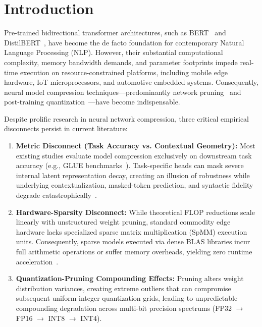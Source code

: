\documentclass[conference]{IEEEtran}
\begin{document}
\section{Introduction}
Pre-trained bidirectional transformer architectures, such as BERT~\cite{devlin2018bert} and DistilBERT~\cite{sanh2019distilbert}, have become the de facto foundation for contemporary Natural Language Processing (NLP). However, their substantial computational complexity, memory bandwidth demands, and parameter footprints impede real-time execution on resource-constrained platforms, including mobile edge hardware, IoT microprocessors, and automotive embedded systems. Consequently, neural model compression techniques---predominantly network pruning~\cite{han2015learning,han2016deep,frankle2018lottery} and post-training quantization~\cite{jacob2018quantization,nagel2021white,dettmers2022llm}---have become indispensable.

Despite prolific research in neural network compression, three critical empirical disconnects persist in current literature:
\begin{enumerate}
    \item \textbf{Metric Disconnect (Task Accuracy vs. Contextual Geometry):} Most existing studies evaluate model compression exclusively on downstream task accuracy (e.g., GLUE benchmarks~\cite{wang2018glue}). Task-specific heads can mask severe internal latent representation decay, creating an illusion of robustness while underlying contextualization, masked-token prediction, and syntactic fidelity degrade catastrophically~\cite{hooker2019compressed}.
    \item \textbf{Hardware-Sparsity Disconnect:} While theoretical FLOP reductions scale linearly with unstructured weight pruning, standard commodity edge hardware lacks specialized sparse matrix multiplication (SpMM) execution units. Consequently, sparse models executed via dense BLAS libraries incur full arithmetic operations or suffer memory overheads, yielding zero runtime acceleration~\cite{hooker2020hardware}.
    \item \textbf{Quantization-Pruning Compounding Effects:} Pruning alters weight distribution variances, creating extreme outliers that can compromise subsequent uniform integer quantization grids, leading to unpredictable compounding degradation across multi-bit precision spectrums (FP32 $\to$ FP16 $\to$ INT8 $\to$ INT4).
\end{enumerate}
\end{document}
